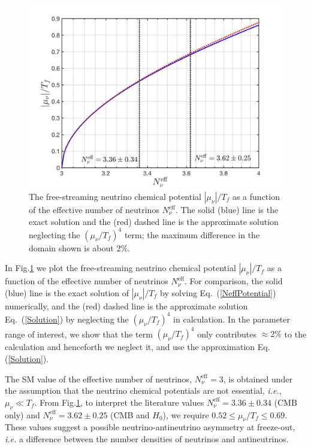 \begin{figure}[t]
\begin{center}
\includegraphics[width=0.9\linewidth]{./plots/Chemical_Potential_Neff}
\caption{The free-streaming neutrino chemical potential $|\mu_\nu|/T_f$ as a function of the effective number of neutrinos $N_\nu^{\mathrm{eff}}$. The solid (blue) line is the exact solution and the (red) dashed line is the approximate solution neglecting the $(\mu_\nu/T_f)^4$ term; the maximum difference in the domain shown is about $2\%$. }
\label{ChemicalPotentialNeff}
\end{center}
\end{figure}
In Fig.\;\ref{ChemicalPotentialNeff} we plot the free-streaming neutrino chemical potential $|\mu_\nu|/T_f$ as a function of the effective number of neutrinos $N_\nu^{\mathrm{eff}}$. For comparison, the solid (blue) line is the exact solution of $|\mu_\nu|/T_f$ by solving Eq.~(\ref{NeffPotential}) numerically, and the (red) dashed line is the approximate solution Eq.~(\ref{Solution}) by neglecting the $(\mu_\nu/T_f)^4$ in calculation. In the parameter range of interest, we show that the term $(\mu_\nu/T_f)^4$ only contributes $\approx 2\%$ to the calculation and henceforth we neglect it, and use the approximation Eq.\;(\ref{Solution}). 

The SM value of the effective number of neutrinos, $N_\nu^{\mathrm{eff}}=3$, is obtained under the assumption that the neutrino chemical potentials are not essential, {\it i.e.\/}, $\mu_\nu\ll T_f$. From Fig.\;\ref{ChemicalPotentialNeff}, to interpret the literature values $N_\nu^{\mathrm{eff}}=3.36\pm0.34$ (CMB only) and $N_\nu^{\mathrm{eff}}= 3.62\pm0.25$ (CMB and $H_0$), we require $0.52\leqslant\mu_\nu/T_f\leqslant0.69$. These values suggest a possible neutrino-antineutrino asymmetry at freeze-out, {\it i.e.\/} a difference between the number densities of neutrinos and antineutrinos.




